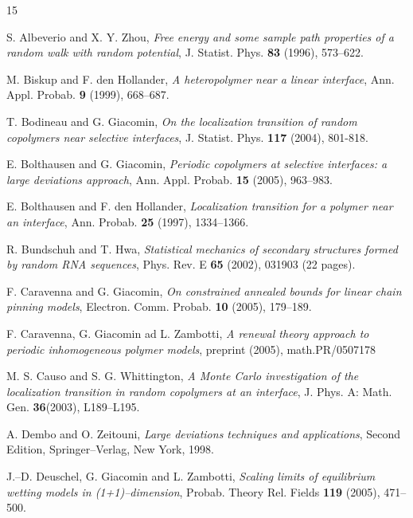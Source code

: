 \documentclass[reqno,11pt]{amsart}
\numberwithin{equation}{section}
\begin{document}
\bigskip

\begin{thebibliography}{15}

S. Albeverio and X. Y. Zhou, \textit{Free energy and some sample path properties of a random walk with random potential},
  J. Statist. Phys. {\bf 83 } (1996),  573--622.

M.  Biskup and F. den Hollander, \textit{A heteropolymer near a linear interface},  Ann. Appl. Probab. {\bf 9} (1999), 668--687.

T. Bodineau and G. Giacomin, \textit{On the localization transition   of random copolymers near selective interfaces},
J. Statist. Phys. {\bf 117} (2004), 801-818.






 E. Bolthausen and G. Giacomin,
 \textit{Periodic copolymers at selective interfaces: a large deviations approach},
 Ann. Appl. Probab. {\bf 15} (2005), 963--983.


 E. Bolthausen and F. den Hollander,
 \textit{Localization transition for a polymer near an interface},
 Ann. Probab.  {\bf 25}  (1997),  1334--1366.



 R. Bundschuh and T. Hwa,
\textit{Statistical mechanics of secondary structures formed by random RNA sequences}, Phys. Rev. E {\bf 65} (2002), 031903 (22 pages).

 F. Caravenna and G. Giacomin,
\textit{On  constrained annealed bounds
for linear chain pinning models},  Electron. Comm. Probab. {\bf 10} (2005), 179--189. 


 F. Caravenna, G. Giacomin ad L. Zambotti,
\textit{A renewal theory approach to periodic inhomogeneous polymer models}, 
preprint (2005), math.PR/0507178

M. S. Causo and S. G. Whittington, \textit{A Monte Carlo investigation of the localization transition in random copolymers at an interface}, J. Phys. A: Math. Gen. {\bf 36}(2003),
L189--L195.

A. Dembo and O. Zeitouni, \textit{Large deviations techniques and applications}, Second Edition, Springer--Verlag, New York, 1998.

J.--D. Deuschel, G. Giacomin and L. Zambotti,
\textit{Scaling limits of  equilibrium wetting models
in  (1+1)--dimension}, Probab. Theory Rel. Fields {\bf 119} (2005), 471--500.


\end{thebibliography}
\end{document}
